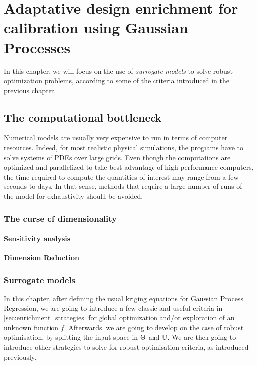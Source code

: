 \documentclass[../../Main_ManuscritThese.tex]{subfiles}
\begin{document}
\chapter{Adaptative design enrichment for calibration using Gaussian Processes}
\label{chap:adaptative_design_gp}
\minitoc
\newpage
\subfileLocal{\pagestyle{contentStyle}}


 In this chapter, we will focus on the use of \emph{surrogate models} to solve robust optimization problems, according to some of the criteria introduced in the previous chapter.

\section{The computational bottleneck}

Numerical models are usually very expensive to run in terms of computer resources. Indeed, for most realistic physical simulations, the programs have to solve systems of PDEs over large grids. Even though the computations are optimized and parallelized to take best advantage of high performance computers, the time required to compute the quantities of interest may range from a few seconds to days. In that sense,  methods that require a large number of runs of the model for exhaustivity should be avoided.
\subsection{The curse of dimensionality}

\subsubsection{Sensitivity analysis}

\subsubsection{Dimension Reduction}
\cite{blanchet-scalliet_specific_2017,ribaud_krigeage_2018}
\subsection{Surrogate models}

In this chapter, after defining the usual kriging equations for Gaussian Process Regression, we are going to introduce a few classic and useful criteria in \cref{sec:enrichment_strategies} for global optimization and/or exploration of an unknown function $f$. Afterwards, we are going to develop on the case of robust optimisation, by splitting the input space in $\Theta$ and $\mathbb{U}$. We are then going to introduce other strategies to solve for robust optimisation criteria, as introduced previously.
\end{document}
